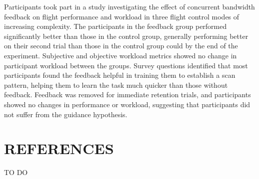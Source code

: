 Participants took part in a study investigating the effect of concurrent bandwidth feedback on flight performance and workload in three flight control modes of increasing complexity.
The participants in the feedback group performed significantly better than those in the control group, generally performing better on their second trial than those in the control group could by the end of the experiment.
Subjective and objective workload metrics showed no change in participant workload between the groups.
Survey questions identified that most participants found the feedback helpful in training them to establish a scan pattern, helping them to learn the task much quicker than those without feedback.
Feedback was removed for immediate retention trials, and participants showed no changes in performance or workload, suggesting that participants did not suffer from the guidance hypothesis.

\section{REFERENCES}

TO DO








